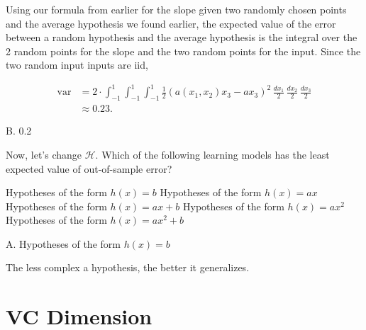 \documentclass[answers]{exam}
\begin{document}
\begin{questions}
\begin{solution}
Using our formula from earlier for the slope given two randomly chosen points
and the average hypothesis we found earlier, the expected value of 
the error between a random hypothesis and the average hypothesis
is the integral over the 2 random points for the slope and the two random 
points for the input. Since the two random input inputs are iid,

\begin{align*}
    \text{var} &= 2 \cdot \int_{-1}^{1} \int_{-1}^{1} \int_{-1}^{1} \frac{1}{2}(a(x_1,x_2)x_3 - ax_3)^2 \, \frac{dx_1}{2} \, \frac{dx_2}{2} \, \frac{dx_3}{2} \\ 
    &\approx 0.23
.\end{align*}

B. 0.2
\end{solution}

\question
Now, let’s change $\mathcal{H}$. Which of the following learning models has the 
least expected value of out-of-sample error?
\begin{choices}
    \choice Hypotheses of the form $h(x) = b$
    \choice Hypotheses of the form $h(x) = ax$
    \choice Hypotheses of the form $h(x) = ax + b$
    \choice Hypotheses of the form $h(x) = ax^2$
    \choice Hypotheses of the form $h(x) = ax^2 + b$
\end{choices}

\begin{solution}
A. Hypotheses of the form $h(x) = b$

The less complex a hypothesis, the better it generalizes.
\end{solution}
\end{questions}

\section*{VC Dimension}
\end{document}
